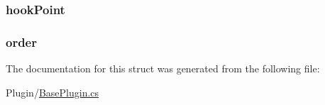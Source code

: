 \subsubsection[{hook\+Point}]{ hook\+Point}\label{structOTA_1_1Plugin_1_1BasePlugin_1_1HookEntry_abd1ad8c99890c1669aada65a70334b82}
\hypertarget{structOTA_1_1Plugin_1_1BasePlugin_1_1HookEntry_a9520c74b73de393087c7b43e85afe624}{}
\subsubsection[{order}]{ order}\label{structOTA_1_1Plugin_1_1BasePlugin_1_1HookEntry_a9520c74b73de393087c7b43e85afe624}


The documentation for this struct was generated from the following file\+:\begin{DoxyCompactItemize}
\item 
Plugin/\hyperlink{BasePlugin_8cs}{Base\+Plugin.\+cs}\end{DoxyCompactItemize}
